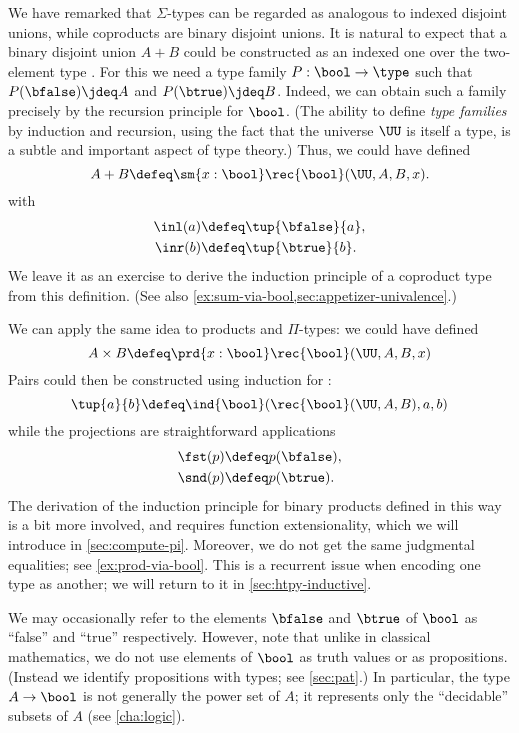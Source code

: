 We have remarked that $\Sigma$-types can be regarded as analogous to indexed disjoint unions, while coproducts are binary disjoint unions.
It is natural to expect that a binary disjoint union $A+B$ could be constructed as an indexed one over the two-element type \bool.
For this we need a type family $P:\bool\to\type$ such that $P(\bfalse)\jdeq A$ and $P(\btrue)\jdeq B$.
Indeed, we can obtain such a family precisely by the recursion principle for $\bool$.
%
(The ability to define \emph{type families} by induction and recursion, using the fact that the universe $\UU$ is itself a type, is a subtle and important aspect of type theory.)
Thus, we could have defined
%
\[ A + B \defeq \sm{x:\bool} \rec{\bool}(\UU,A,B,x). \]
with
\begin{align*}
  \inl(a) &\defeq \tup{\bfalse}{a}, \\
  \inr(b) &\defeq \tup{\btrue}{b}.
\end{align*}
We leave it as an exercise to derive the induction principle of a coproduct type from this definition.
(See also \cref{ex:sum-via-bool,sec:appetizer-univalence}.)

We can apply the same idea to products and $\Pi$-types: we could have defined
\[ A \times B \defeq \prd{x:\bool}\rec{\bool}(\UU,A,B,x) \]
Pairs could then be constructed using induction for \bool:
\[ \tup{a}{b} \defeq \ind{\bool}(\rec{\bool}(\UU,A,B),a,b) \]
while the projections are straightforward applications
\begin{align*}
  \fst(p) &\defeq p(\bfalse), \\
  \snd(p) &\defeq p(\btrue).
\end{align*}
The derivation of the induction principle for binary products defined in this way is a bit more involved, and requires function extensionality, which we will introduce in \cref{sec:compute-pi}.
Moreover, we do not get the same judgmental equalities; see \cref{ex:prod-via-bool}.
This is a recurrent issue when encoding one type as another; we will return to it in \cref{sec:htpy-inductive}. 

We may occasionally refer to the elements $\bfalse$ and $\btrue$ of $\bool$ as ``false'' and ``true'' respectively.
However, note that unlike in classical mathematics, we do not use elements of $\bool$ as truth values
%
or as propositions.
(Instead we identify propositions with types; see \cref{sec:pat}.)
In particular, the type $A \to \bool$ is not generally the power set of $A$; it represents only the ``decidable'' subsets of $A$ (see \cref{cha:logic}).
%

